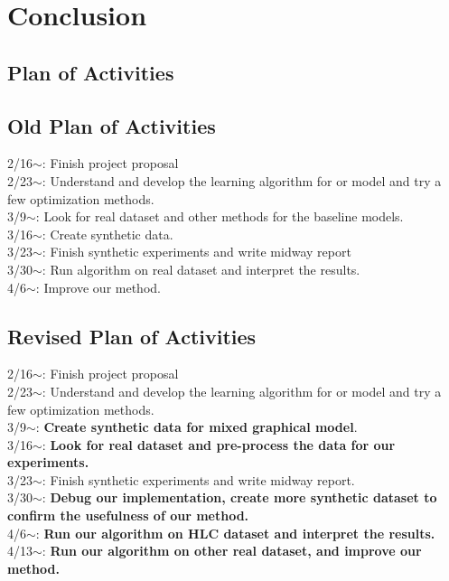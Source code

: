 \documentclass{article}
\begin{document}
\section{Conclusion}


\begin{appendices}
\section{Plan of Activities}
\subsection{Old Plan of Activities}
2/16$\sim$: Finish project proposal \\
2/23$\sim$: Understand and develop the learning algorithm for or model and try a few optimization methods. \\
3/9$\sim$: Look for real dataset and other methods for the baseline models.\\
3/16$\sim$:  Create synthetic data. \\ 
3/23$\sim$: Finish synthetic experiments and write midway report \\
3/30$\sim$: Run algorithm on real dataset and interpret the results. \\
4/6$\sim$: Improve our method. \\

\subsection{Revised Plan of Activities}

2/16$\sim$: Finish project proposal \\
2/23$\sim$: Understand and develop the learning algorithm for or model and try a few optimization methods. \\
3/9$\sim$:  \textbf{Create synthetic data for mixed graphical model}. \\ 
3/16$\sim$: \textbf{Look for real dataset and pre-process the data for our experiments.}\\
3/23$\sim$: Finish synthetic experiments and write midway report. \\
3/30$\sim$: \textbf{Debug our implementation, create more synthetic dataset to confirm the usefulness of our method.} \\
4/6$\sim$: \textbf{Run our algorithm on HLC dataset and interpret the results.} \\
4/13$\sim$: \textbf{Run our algorithm on other real dataset, and improve our method.} \\

\end{appendices}

\nocite{*}


\end{document}
